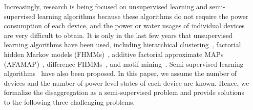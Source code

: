 Increasingly,  
research is being focused on unsupervised learning and semi-supervised learning algorithms because  
these algorithms do not require the power consumption of 
each device,   
and the power or water usages of individual devices are very difficult to obtain. 
It is only in
 the last few years that 
unsupervised learning algorithms
have been used, including
hierarchical clustering~\cite{gonccalves2011unsupervised},
factorial hidden Markov models (FHMMs)~\cite{kim2011unsupervised},
additive factorial approximate MAPs (AFAMAP)~\cite{kolter2012aistat}, 
difference FHMMs~\cite{parson2012nonintrusive}, 
and motif mining~\cite{shao2013temporal}.
Semi-supervised learning 
algorithms~\cite{lam2007novel,johnson2012bayesian} have also
been proposed.
In this paper, we assume the number of devices 
and the number of power level states of each device 
are known. Hence, we formalize the disaggregation 
as a semi-supervised problem and 
provide solutions to the following three challenging problems.
